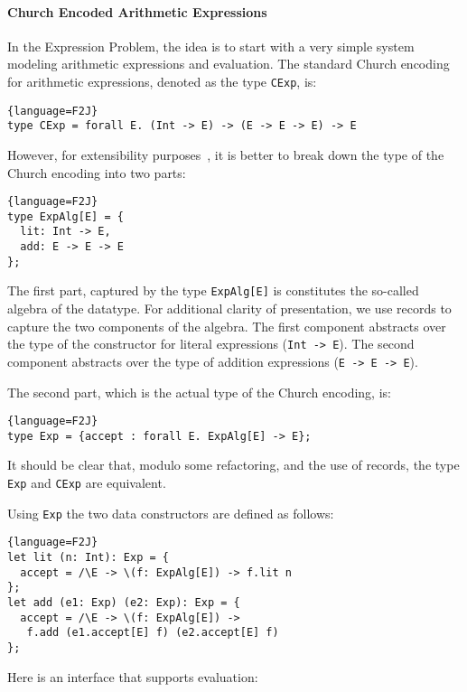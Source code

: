 \paragraph{Church Encoded Arithmetic Expressions}
In the Expression Problem, the idea is to start with a very simple
system modeling arithmetic expressions and evaluation.
The standard Church encoding for arithmetic expressions,
denoted as the type \lstinline{CExp}, is:

\begin{lstlisting}{language=F2J}
type CExp = forall E. (Int -> E) -> (E -> E -> E) -> E
\end{lstlisting}

\noindent However, for extensibility purposes~\cite{}, it is better to break
down the type of the Church encoding into two parts:

\begin{lstlisting}{language=F2J}
type ExpAlg[E] = {
  lit: Int -> E,
  add: E -> E -> E
};
\end{lstlisting}

\noindent The first part, captured by the type \lstinline{ExpAlg[E]}
is constitutes the so-called algebra of the datatype. For additional
clarity of presentation, we use records to capture the two components
of the algebra. The first component abstracts over the type of the
constructor for literal expressions (\lstinline{Int -> E}). The second
component abstracts over the type of addition expressions
(\lstinline{E -> E -> E}).

The second part, which is the actual type of the Church encoding, is:

\begin{lstlisting}{language=F2J}
type Exp = {accept : forall E. ExpAlg[E] -> E};
\end{lstlisting}

\noindent It should be clear that, modulo some refactoring, and the
use of records, the type \lstinline{Exp} and \lstinline{CExp}
are equivalent.

Using \lstinline{Exp} the two data constructors are defined as follows:

\begin{lstlisting}{language=F2J}
let lit (n: Int): Exp = {
  accept = /\E -> \(f: ExpAlg[E]) -> f.lit n
};
let add (e1: Exp) (e2: Exp): Exp = {
  accept = /\E -> \(f: ExpAlg[E]) ->
   f.add (e1.accept[E] f) (e2.accept[E] f)
};
\end{lstlisting}

Here is an interface that supports evaluation:

